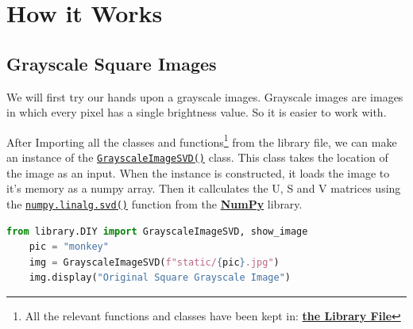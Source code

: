 \section{How it Works}

	\subsection{Grayscale Square Images}

		We will first try our hands upon a grayscale images. Grayscale images are images in which every pixel has a single brightness value. So it is easier to work with.
		
		After Importing all the classes and functions\footnote{All the relevant functions and classes have been kept in: \href{https://github.com/PeithonKing/comp_phys_P346/blob/main/library/DIY.py}{\textbf{the Library File}}} from the library file, we can make an instance of the \href{https://github.com/PeithonKing/comp_phys_P346/blob/main/library/DIY.py#L62-L84}{\texttt{GrayscaleImageSVD()}} class. This class takes the location of the image as an input. When the instance is constructed, it loads the image to it's memory as a numpy array. Then it callculates the U, S and V matrices using the \href{https://numpy.org/doc/stable/reference/generated/numpy.linalg.svd.html}{\texttt{numpy.linalg.svd()}} function from the \href{https://numpy.org/}{\textbf{NumPy}} library.
		\vspace{-2mm}

		\begin{center}
			\noindent{}
		\end{center}

		\begin{lstlisting}[language=Python, caption={Creating GrayscaleImageSVD class}]
	from library.DIY import GrayscaleImageSVD, show_image
	pic = "monkey"
	img = GrayscaleImageSVD(f"static/{pic}.jpg")
	img.display("Original Square Grayscale Image")\end{lstlisting}
		

